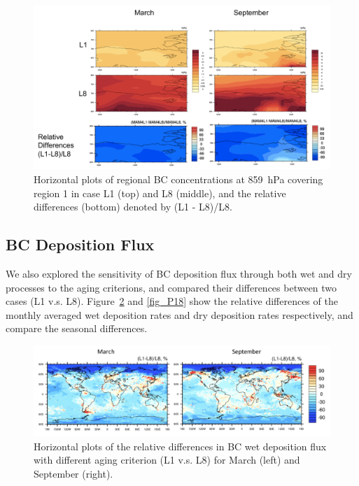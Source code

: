 \documentclass[12pt, fullpage]{uiucthesis2009_2}
\begin{document}
	
	\begin{figure}[h] 
		\begin{center}
			\includegraphics[width = 1\textwidth]{Figure20}
			\caption[Horizontal plots of regional BC concentrations at 859~hPa covering region 1 in case L1 (top) and L8 (middle), and the relative differences (bottom) denoted by (L1 - L8)/L8]{\label{fig_P20} Horizontal plots of regional BC concentrations at 859~hPa covering region 1 in case L1 (top) and L8 (middle), and the relative differences (bottom) denoted by (L1 - L8)/L8.}
		\end{center}
	\end{figure}
	
	\subsection{BC Deposition Flux}
	We also explored the sensitivity of BC deposition flux through both wet and dry processes to the aging criterions, and compared their differences between two cases (L1 v.s. L8). Figure~\ref{fig_P17} and \ref{fig_P18} show the relative differences of the monthly averaged wet deposition rates and dry deposition rates respectively, and compare the seasonal differences. 
	
	\begin{figure}[h] 
		\begin{center}
			\includegraphics[width = 1\textwidth]{Figure17}
			\caption[Horizontal plots of the relative differences in BC wet deposition flux with different aging criterion (L1 v.s. L8) for March (left) and September (right).]{\label{fig_P17} Horizontal plots of the relative differences in BC wet deposition flux with different aging criterion (L1 v.s. L8) for March (left) and September (right).}
		\end{center}
	\end{figure}
	
\end{document}
